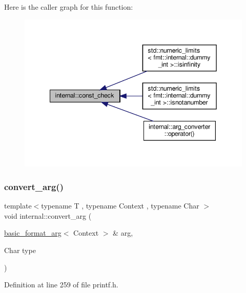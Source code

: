 Here is the caller graph for this function\+:
\nopagebreak
\begin{figure}[H]
\begin{center}
\leavevmode
\includegraphics[width=342pt]{namespaceinternal_ab4bd4ce115d79a68ea0f8f03e6cf8988_icgraph}
\end{center}
\end{figure}
\mbox{\label{namespaceinternal_a51007b037fc1ae75f525ff89401ec56b}} 
\subsubsection{\texorpdfstring{convert\+\_\+arg()}{convert\_arg()}}
{\footnotesize\ttfamily template$<$typename T , typename Context , typename Char $>$ \\
void internal\+::convert\+\_\+arg (\begin{DoxyParamCaption}\item[{\hyperlink{classbasic__format__arg}{basic\+\_\+format\+\_\+arg}$<$ Context $>$ \&}]{arg,  }\item[{Char}]{type }\end{DoxyParamCaption})}



Definition at line 259 of file printf.\+h.

